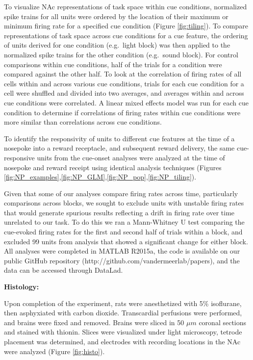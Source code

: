 \documentclass[11pt]{article}
\begin{document}
To visualize NAc representations of task space within cue conditions, normalized spike trains for all units were ordered by the location of their maximum or minimum firing rate for a specified cue condition (Figure \ref{fig:tiling}). To compare representations of task space across cue conditions for a cue feature, the ordering of units derived for one condition (e.g.\ light block) was then applied to the normalized spike trains for the other condition (e.g.\ sound block). For control comparisons within cue conditions, half of the trials for a condition were compared against the other half. To look at the correlation of firing rates of all cells within and across various cue conditions, trials for each cue condition for a cell were shuffled and divided into two averages, and averages within and across cue conditions were correlated. A linear mixed effects model was run for each cue condition to determine if correlations of firing rates within cue conditions were more similar than correlations across cue conditions.

To identify the responsivity of units to different cue features at the time of a nosepoke into a reward receptacle, and subsequent reward delivery, the same cue-responsive units from the cue-onset analyses were analyzed at the time of nosepoke and reward receipt using identical analysis techniques (Figures \ref{fig:NP_examples},\ref{fig:NP_GLM},\ref{fig:NP_pop},\ref{fig:NP_tiling}).

Given that some of our analyses compare firing rates across time, particularly comparisons across blocks, we sought to exclude units with unstable firing rates that would generate spurious results reflecting a drift in firing rate over time unrelated to our task. To do this we ran a Mann-Whitney U test comparing the cue-evoked firing rates for the first and second half of trials within a block, and excluded 99 units from analysis that showed a significant change for either block. All analyses were completed in MATLAB R2015a, the code is available on our public GitHub repository (http://github.com/vandermeerlab/papers), and the data can be accessed through DataLad.

{\bf Histology:}

Upon completion of the experiment, rats were anesthetized with 5\% isoflurane, then asphyxiated with carbon dioxide. Transcardial perfusions were performed, and brains were fixed and removed. Brains were sliced in 50 $\mu m$ coronal sections and stained with thionin. Slices were visualized under light microscopy, tetrode placement was determined, and electrodes with recording locations in the NAc were analyzed (Figure \ref{fig:histo}).
\end{document}
